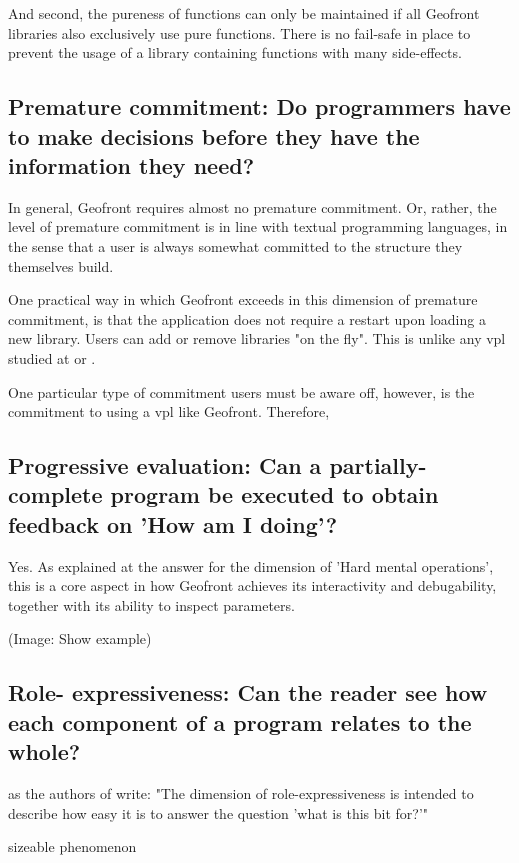 And second, the pureness of functions can only be maintained if all Geofront libraries also exclusively use pure functions. 
There is no fail-safe in place to prevent the usage of a library containing functions with many side-effects. 

\subsection*{Premature commitment: Do programmers have to make decisions before they have the information they need?}

In general, Geofront requires almost no premature commitment. 
Or, rather, the level of premature commitment is in line with textual programming languages, in the sense that a user is always somewhat committed to the structure they themselves build. 

One practical way in which Geofront exceeds in this dimension of premature commitment, is that the application does not require a restart upon loading a new library. 
Users can add or remove libraries "on the fly". 
This is unlike any vpl studied at  or .

One particular type of commitment users must be aware off, however, is the commitment to using a \ac{vpl} like Geofront. 
Therefore, 


\subsection*{Progressive evaluation: Can a partially-complete program be executed to obtain feedback on 'How am I doing'?}

Yes. 
As explained at the answer for the dimension of 'Hard mental operations', this is a core aspect in how Geofront achieves its interactivity and debugability, together with its ability to inspect parameters. 

(Image: Show example)

\subsection*{Role- expressiveness: Can the reader see how each component of a program relates to the whole?}

as the authors of \cite[]{green_usability_1996} write: "The dimension of role-expressiveness is intended to describe how easy it is to answer the question 'what is this bit for?'"

sizeable phenomenon

